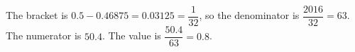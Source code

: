 The bracket is $0.5-0.46875=0.03125=\dfrac{1}{32}$, so the denominator is $\dfrac{2016}{32}=63$. The numerator is $50.4$. The value is $\dfrac{50.4}{63}=\boxed{0.8}$.
